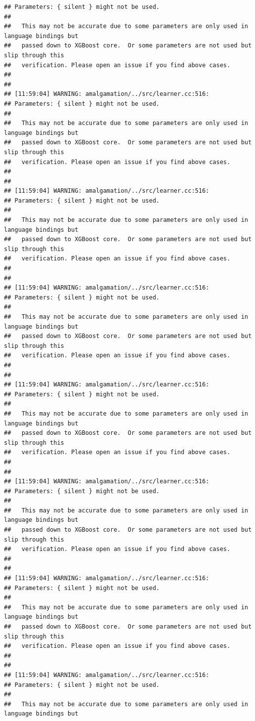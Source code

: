 \documentclass[AMS,STIX2COL]{WileyNJD-v2}\usepackage[]{graphicx}\usepackage[]{color}
\makeatletter
\newenvironment{kframe}{%
 \def\at@end@of@kframe{}%
 \ifinner\ifhmode%
  \def\at@end@of@kframe{\end{minipage}}%
  \begin{minipage}{\columnwidth}%
 \fi\fi%
 \def\FrameCommand##1{\hskip\@totalleftmargin \hskip-\fboxsep
 \colorbox{shadecolor}{##1}\hskip-\fboxsep
     \hskip-\linewidth \hskip-\@totalleftmargin \hskip\columnwidth}%
 \MakeFramed {\advance\hsize-\width
   \@totalleftmargin\z@ \linewidth\hsize
   \@setminipage}}%
 {\par\unskip\endMakeFramed%
 \at@end@of@kframe}
\newenvironment{knitrout}{}{} %
\makeatother
\begin{document}
\begin{knitrout}
\begin{kframe}
\begin{verbatim}
## Parameters: { silent } might not be used.
## 
##   This may not be accurate due to some parameters are only used in language bindings but
##   passed down to XGBoost core.  Or some parameters are not used but slip through this
##   verification. Please open an issue if you find above cases.
## 
## 
## [11:59:04] WARNING: amalgamation/../src/learner.cc:516: 
## Parameters: { silent } might not be used.
## 
##   This may not be accurate due to some parameters are only used in language bindings but
##   passed down to XGBoost core.  Or some parameters are not used but slip through this
##   verification. Please open an issue if you find above cases.
## 
## 
## [11:59:04] WARNING: amalgamation/../src/learner.cc:516: 
## Parameters: { silent } might not be used.
## 
##   This may not be accurate due to some parameters are only used in language bindings but
##   passed down to XGBoost core.  Or some parameters are not used but slip through this
##   verification. Please open an issue if you find above cases.
## 
## 
## [11:59:04] WARNING: amalgamation/../src/learner.cc:516: 
## Parameters: { silent } might not be used.
## 
##   This may not be accurate due to some parameters are only used in language bindings but
##   passed down to XGBoost core.  Or some parameters are not used but slip through this
##   verification. Please open an issue if you find above cases.
## 
## 
## [11:59:04] WARNING: amalgamation/../src/learner.cc:516: 
## Parameters: { silent } might not be used.
## 
##   This may not be accurate due to some parameters are only used in language bindings but
##   passed down to XGBoost core.  Or some parameters are not used but slip through this
##   verification. Please open an issue if you find above cases.
## 
## 
## [11:59:04] WARNING: amalgamation/../src/learner.cc:516: 
## Parameters: { silent } might not be used.
## 
##   This may not be accurate due to some parameters are only used in language bindings but
##   passed down to XGBoost core.  Or some parameters are not used but slip through this
##   verification. Please open an issue if you find above cases.
## 
## 
## [11:59:04] WARNING: amalgamation/../src/learner.cc:516: 
## Parameters: { silent } might not be used.
## 
##   This may not be accurate due to some parameters are only used in language bindings but
##   passed down to XGBoost core.  Or some parameters are not used but slip through this
##   verification. Please open an issue if you find above cases.
## 
## 
## [11:59:04] WARNING: amalgamation/../src/learner.cc:516: 
## Parameters: { silent } might not be used.
## 
##   This may not be accurate due to some parameters are only used in language bindings but

\end{verbatim}
\end{kframe}
\end{knitrout}
\end{document}
